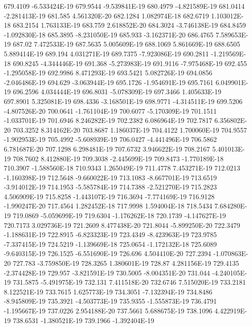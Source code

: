 679.4109  -6.533424E-19
679.9544  -9.539841E-19
680.4979  -4.821589E-19
681.0414  -2.281413E-19
681.585  4.561320E-20
682.1284  1.082974E-18
682.6719  1.103012E-18
683.2154  1.763133E-19
683.759  2.618852E-20
684.3024  -3.746138E-19
684.8459  -1.092830E-18
685.3895  -8.231050E-19
685.933  -3.162371E-20
686.4765  7.589653E-19
687.02  7.472533E-19
687.5635  5.005609E-19
688.1069  5.861669E-19
688.6505  5.889414E-19
689.194  4.031271E-19
689.7375  -7.923086E-19
690.2811  -1.219569E-18
690.8245  -4.344446E-19
691.368  -5.273983E-19
691.9116  -7.975468E-19
692.455  -1.295058E-19
692.9986  8.471293E-19
693.5421  5.082726E-19
694.0856  -2.046486E-19
694.629  -3.063944E-19
695.1726  -1.954691E-19
695.7161  6.049901E-19
696.2596  4.034444E-19
696.8031  -5.078309E-19
697.3466  1.405633E-19
697.8901  5.325081E-19
698.4336  -3.168501E-19
698.9771  -4.314511E-19
699.5206  -4.807526E-20
700.0641  -1.761104E-19
700.6077  -5.170309E-19
701.1511  -1.033701E-19
701.6946  8.246282E-19
702.2382  6.086964E-19
702.7817  6.356802E-20
703.3252  8.314162E-20
703.8687  1.186037E-19
704.4122  1.700060E-19
704.9557  -1.902953E-19
705.4992  -5.608939E-19
706.0427  -4.441496E-19
706.5862  6.781687E-20
707.1298  6.298481E-19
707.6732  3.946622E-19
708.2167  5.401013E-19
708.7602  8.412880E-19
709.3038  -2.445699E-19
709.8473  -1.770189E-18
710.3907  -1.588560E-18
710.9343  1.265049E-19
711.4778  7.453271E-19
712.0213  -1.160398E-19
712.5648  -9.660022E-19
713.1083  -8.667701E-19
713.6519  -3.914012E-19
714.1953  -5.585784E-19
714.7388  -2.521270E-19
715.2823  4.506909E-19
715.8258  -1.443107E-19
716.3694  -7.774169E-19
716.9128  -1.990247E-20
717.4564  1.282452E-18
717.9998  1.594004E-18
718.5434  7.684280E-19
719.0869  -5.059699E-19
719.6304  -1.176262E-18
720.1739  -4.147627E-19
720.7173  3.029736E-19
721.2609  8.477438E-20
721.8044  -5.899250E-20
722.3479  -1.188631E-19
722.8915  -6.823323E-19
723.4349  -8.423963E-19
723.9785  -7.337415E-19
724.5219  -1.139669E-18
725.0654  -1.172132E-18
725.6089  -9.640315E-19
726.1525  -6.551690E-19
726.696  4.504410E-20
727.2394  -1.070863E-20
727.783  -3.759850E-19
728.3265  1.380601E-19
728.87  4.281156E-19
729.4135  -2.374428E-19
729.957  -3.821591E-19
730.5005  -8.004351E-20
731.044  -4.240105E-19
731.5875  -5.491975E-19
732.131  7.411518E-20
732.6746  7.515020E-19
733.2181  8.122521E-19
733.7615  1.625773E-19
734.3051  -7.132394E-19
734.8486  -8.945809E-19
735.3921  -4.503773E-19
735.9355  -1.555873E-19
736.4791  -1.195667E-19
737.0226  2.954188E-20
737.5661  5.688675E-19
738.1096  4.422919E-19
738.6531  -1.380521E-19
739.1966  -1.392404E-19
